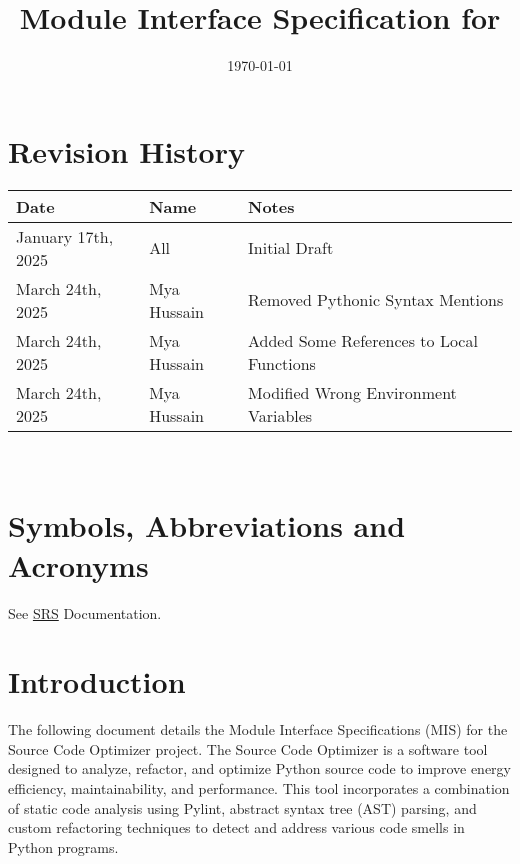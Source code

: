 \documentclass[12pt, titlepage]{article}
\begin{document}
\title{Module Interface Specification for \progname{}}

\author{\authname}

\date{\today}

\maketitle


\section{Revision History}

\begin{tabularx}{\textwidth}{p{3cm}p{2cm}X}
\toprule {\bf Date} & {\bf Name} & {\bf Notes}\\
\midrule
January 17th, 2025 & All & Initial Draft\\
March 24th, 2025 & Mya Hussain & Removed Pythonic Syntax Mentions\\
March 24th, 2025 & Mya Hussain & Added Some References to Local Functions\\
March 24th, 2025 & Mya Hussain & Modified Wrong Environment Variables\\
\bottomrule
\end{tabularx}

~\newpage

\section{Symbols, Abbreviations and Acronyms}

See \href{https://github.com/ssm-lab/capstone--source-code-optimizer/blob/main/docs/SRS/SRS.pdf}{SRS} Documentation.


\newpage

\tableofcontents

\newpage


\section{Introduction}

The following document details the Module Interface Specifications (MIS) for the Source Code Optimizer project. The Source Code Optimizer is a software tool designed to analyze, refactor, and optimize Python source code to improve energy efficiency, maintainability, and performance. This tool incorporates a combination of static code analysis using Pylint, abstract syntax tree (AST) parsing, and custom refactoring techniques to detect and address various code smells in Python programs.
\end{document}
